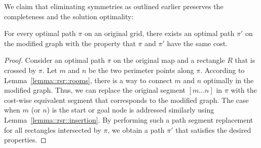 We claim that eliminating symmetries as outlined earlier
preserves the completeness and the solution optimality:
\begin{theorem}
For every optimal path $\pi$ on an original grid, there exists an optimal path
$\pi'$ on the modified graph with the property that $\pi$ and $\pi'$ have the
same cost.
\end{theorem}
\begin{proof}
Consider an optimal path $\pi$ on the original map and a rectangle $R$ that is
crossed by $\pi$.  Let $m$ and $n$ be the two perimeter points along $\pi$.
According to Lemma~\ref{lemma::rsr::rooms}, there is a way to connect $m$ and $n$
optimally in the modified graph. Thus, we can replace the original segment $[m
\dots n]$ in $\pi$ with the cost-wise equivalent segment that corresponds to the
modified graph.  The case when $m$ (or $n$) is the start or goal node is
addressed similarly using Lemma~\ref{lemma::rsr::insertion}.  By performing such a
path segment replacement for all rectangles intersected by $\pi$, we obtain a
path $\pi'$ that satisfies the desired properties.
\end{proof}

